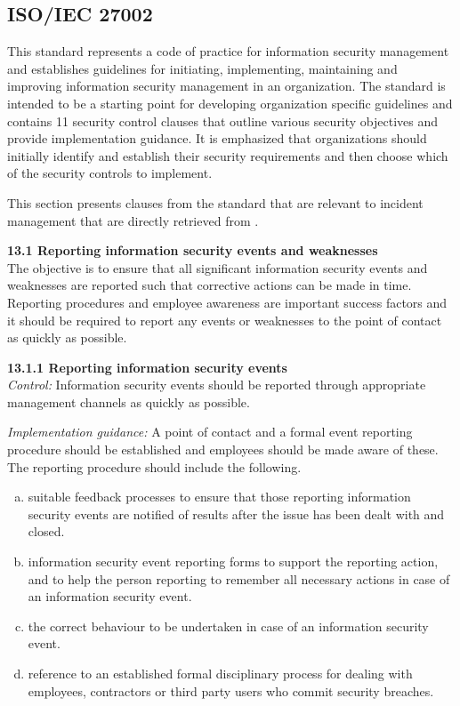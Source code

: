 \subsection{\acs{ISO}/\acs{IEC} 27002}
\label{sec:iso27002}
This standard represents a code of practice for information security management and establishes guidelines for initiating, implementing, maintaining and improving information security management in an organization. The standard is intended to be a starting point for developing organization specific guidelines and contains 11 security control clauses that outline various security objectives and provide implementation guidance. It is emphasized that organizations should initially identify and establish their security requirements and then choose which of the security controls to implement.

This section presents clauses from the standard that are relevant to incident management that are directly retrieved from \cite{ISO/IEC27002}.

\textbf{13.1 Reporting information security events and weaknesses } \\
The objective is to ensure that all significant information security events and weaknesses are reported such that corrective actions can be made in time. Reporting procedures and employee awareness are important success factors and it should be required to report any events or weaknesses to the point of contact as quickly as possible.

\textbf{13.1.1 Reporting information security events} \\
\emph{Control:} Information security events should be reported through appropriate management channels as quickly as possible.

\emph{Implementation guidance:} A point of contact and a formal event reporting procedure should be established and employees should be made aware of these. The reporting procedure should include the following.
\begin{enumerate}[a)]
\item suitable feedback processes to ensure that those reporting information security events are notified of results after the issue has been dealt with and closed.
\item information security event reporting forms to support the reporting action, and to help the person reporting to remember all necessary actions in case of an information security event.
\item the correct behaviour to be undertaken in case of an information security event.
\item reference to an established formal disciplinary process for dealing with employees, contractors or third party users who commit security breaches.
\end{enumerate}


